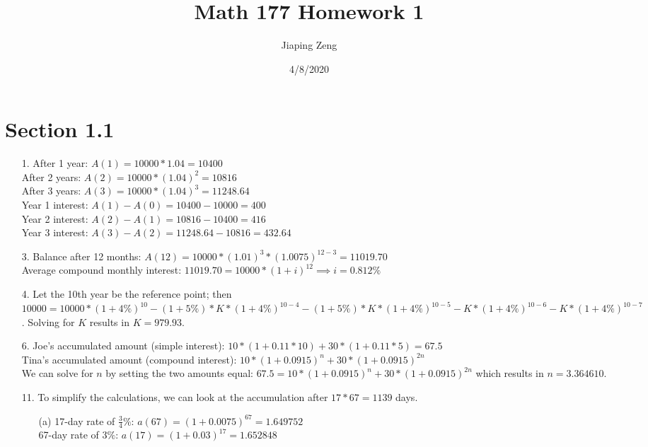\documentclass{article}
\title{Math 177 Homework 1}
\date{4/8/2020}
\author{Jiaping Zeng}
\begin{document}
\maketitle

\section*{Section 1.1}
\begin{itemize}
      \item [1.]
            After 1 year: $A(1)=10000*1.04=\boxed{10400}$\\
            After 2 years: $A(2)=10000*(1.04)^2=\boxed{10816}$\\
            After 3 years: $A(3)=10000*(1.04)^3=\boxed{11248.64}$\\
            Year 1 interest: $A(1)-A(0)=10400-10000=\boxed{400}$\\
            Year 2 interest: $A(2)-A(1)=10816-10400=\boxed{416}$\\
            Year 3 interest: $A(3)-A(2)=11248.64-10816=\boxed{432.64}$
      \item [3.]
            Balance after 12 months: $A(12)=10000*(1.01)^3*(1.0075)^{12-3}=\boxed{11019.70}$\\
            Average compound monthly interest: $11019.70=10000*(1+i)^{12} \implies \boxed{i=0.812\%}$
      \item [4.]
            Let the 10th year be the reference point; then $10000=10000*(1+4\%)^{10}-(1+5\%)*K*(1+4\%)^{10-4}-(1+5\%)*K*(1+4\%)^{10-5}-K*(1+4\%)^{10-6}-K*(1+4\%)^{10-7}$. Solving for $K$ results in $\boxed{K=979.93}$.
      \item [6.]
            Joe's accumulated amount (simple interest): $10*(1+0.11*10) + 30*(1+0.11*5)=67.5$\\
            Tina's accumulated amount (compound interest): $10*(1+0.0915)^n+30*(1+0.0915)^{2n}$\\
            We can solve for $n$ by setting the two amounts equal: $67.5=10*(1+0.0915)^n+30*(1+0.0915)^{2n}$ which results in $\boxed{n=3.364610}$.
      \item [11.]
            To simplify the calculations, we can look at the accumulation after $17*67=1139$ days.
            \begin{itemize}
                  \item [(a)]
                        17-day rate of $\frac{3}{4}\%$: $a(67)=(1+0.0075)^{67}=1.649752$\\
                        67-day rate of $3\%$: $a(17)=(1+0.03)^{17}=1.652848$\\

\end{itemize}
\end{itemize}
\end{document}
